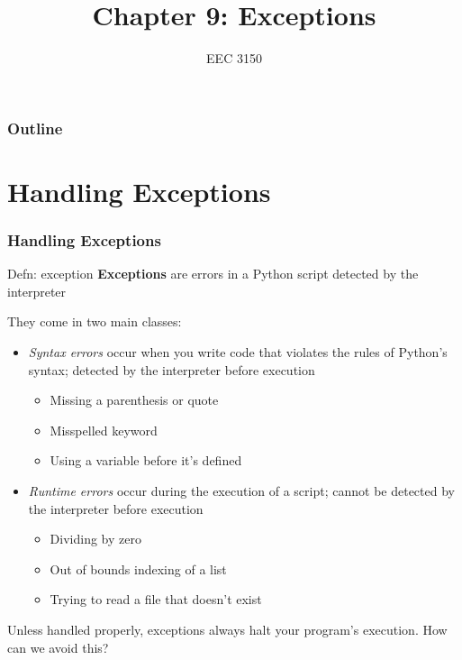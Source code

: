 \documentclass{beamer}
\title{Chapter 9: Exceptions}
\author{EEC 3150}
\date{}
\institute{Trevecca Nazarene University}
\begin{document}
\frame{\titlepage}
 
\begin{frame}	
	\frametitle{Outline}
	\tableofcontents	
\end{frame}


\section{Handling Exceptions}

\begin{frame}	
\end{frame}

\begin{frame}	
	\frametitle{Handling Exceptions}
	
	\begin{alertblock}{Defn: exception}
		\textbf{Exceptions} are errors in a Python script detected by the interpreter
		
		\vspace{10pt}
		They come in two main classes:
		\begin{itemize}
			\item \emph{Syntax errors} occur when you write code that violates the rules of Python's syntax; detected by the interpreter before execution
			\begin{itemize}
				\item Missing a parenthesis or quote
				\item Misspelled keyword
				\item Using a variable before it's defined
			\end{itemize}
			\item \emph{Runtime errors} occur during the execution of a script; cannot be detected by the interpreter before execution
			\begin{itemize}
				\item Dividing by zero
				\item Out of bounds indexing of a list
				\item Trying to read a file that doesn't exist
			\end{itemize}
		\end{itemize}
		
		\vspace{5pt}
		Unless handled properly, exceptions always halt your program's execution. How can we avoid this?
	\end{alertblock}
	
\end{frame}
\end{document}

